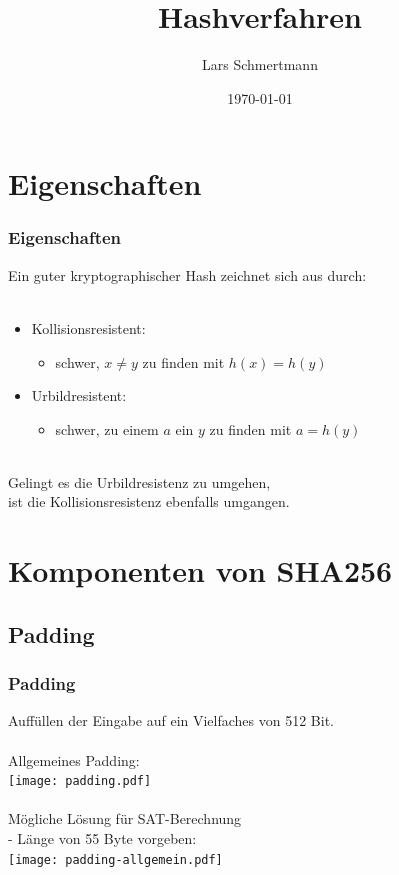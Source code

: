 \documentclass{beamer}
\title{Hashverfahren}
\author{Lars Schmertmann}
\date{\today}
\begin{document}
\maketitle


\section{Eigenschaften}
  \begin{frame}
    \frametitle{Eigenschaften}
    Ein guter kryptographischer Hash zeichnet sich aus durch:\\
    ~\\
    \begin{itemize}
      \setlength{\itemsep}{20pt}
      \item Kollisionsresistent:
      \begin{itemize}
        \item schwer, $ x \neq y $ zu finden mit $ h(x) = h(y) $
      \end{itemize}
      \item Urbildresistent:
      \begin{itemize}
        \item schwer, zu einem $ a $ ein $ y $ zu finden mit $ a = h(y) $
      \end{itemize}
    \end{itemize}
    ~\\
    Gelingt es die Urbildresistenz zu umgehen,\\
    ist die Kollisionsresistenz ebenfalls umgangen.
  \end{frame}

\section{Komponenten von SHA256}
\subsection{Padding}
  \begin{frame}
    \frametitle{Padding}
    Auffüllen der Eingabe auf ein Vielfaches von 512 Bit.\\
    ~\\
    Allgemeines Padding:\\
    \texttt{[image: padding.pdf]}\\
    \pause~\\
    Mögliche Lösung für SAT-Berechnung\\
    - Länge von 55 Byte vorgeben:\\
    \texttt{[image: padding-allgemein.pdf]}
  \end{frame}
\end{document}
